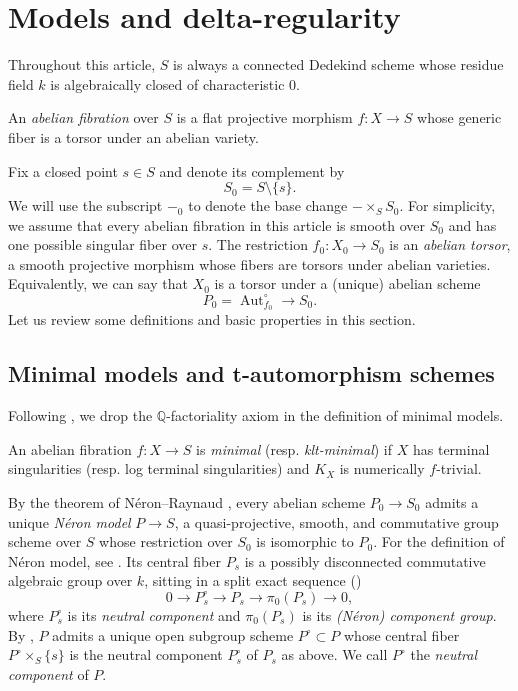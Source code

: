 \documentclass[reqno, letterpaper]{amsart}
\numberwithin{equation}{subsection}
\let\to\longrightarrow
\newcommand{\QQ}{\mathbb{Q}}
\DeclareMathOperator{\Aut}{Aut}
\begin{document}
		
		
\section{Models and delta-regularity} \label{sec:models and delta-regularity}
	Throughout this article, $S$ is always a connected Dedekind scheme whose residue field $k$ is algebraically closed of characteristic $0$.
	
	\begin{definition}
		An \emph{abelian fibration} over $S$ is a flat projective morphism $f : X \to S$ whose generic fiber is a torsor under an abelian variety.
	\end{definition}
	
	Fix a closed point $s \in S$ and denote its complement by
	\[ S_0 = S \setminus \{ s \} .\]
	We will use the subscript $-_0$ to denote the base change $- \times_S S_0$. For simplicity, we assume that every abelian fibration in this article is smooth over $S_0$ and has one possible singular fiber over $s$. The restriction $f_0 : X_0 \to S_0$ is an \emph{abelian torsor}, a smooth projective morphism whose fibers are torsors under abelian varieties. Equivalently, we can say that $X_0$ is a torsor under a (unique) abelian scheme
	\begin{equation} \label{eq:abelian scheme}
		P_0 = \Aut^{\circ}_{f_0} \to S_0 .
	\end{equation}
	Let us review some definitions and basic properties in this section.
	
	
	
	\subsection{Minimal models and t-automorphism schemes}
		Following \cite[(16)]{kol25:neron}, we drop the $\QQ$-factoriality axiom in the definition of minimal models.
		
		\begin{definition} \label{def:minimal abelian fibration}
			An abelian fibration $f : X \to S$ is \emph{minimal} (resp. \emph{klt-minimal}) if $X$ has terminal singularities (resp. log terminal singularities) and $K_X$ is numerically $f$-trivial.
		\end{definition}
		
		By the theorem of N\'eron--Raynaud \cite{neron:original_article, raynaud:neron}, every abelian scheme $P_0 \to S_0$ admits a unique \emph{N\'eron model} $P \to S$, a quasi-projective, smooth, and commutative group scheme over $S$ whose restriction over $S_0$ is isomorphic to $P_0$. For the definition of N\'eron model, see \cite{neron}. Its central fiber $P_s$ is a possibly disconnected commutative algebraic group over $k$, sitting in a split exact sequence ()
		\[ 0 \to P^\circ_s \to P_s \to \pi_0(P_s) \to 0 ,\]
		where $P^\circ_s$ is its \emph{neutral component} and $\pi_0 (P_s)$ is its \emph{(N\'eron) component group}. By \cite[$\mathrm{IV_B}$ Theorem~3.10]{SGA3I}, $P$ admits a unique open subgroup scheme $P^\circ \subset P$ whose central fiber $P^\circ \times_S \{ s \}$ is the neutral component $P^\circ_s$ of $P_s$ as above. We call $P^\circ$ the \emph{neutral component} of $P$.
		
\end{document}
